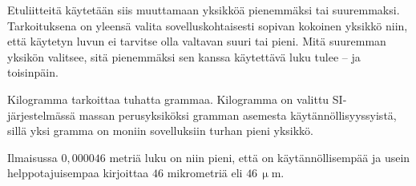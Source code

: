 

Etuliitteitä käytetään siis muuttamaan yksikköä pienemmäksi tai suuremmaksi. Tarkoituksena on yleensä valita sovelluskohtaisesti sopivan kokoinen yksikkö niin, että käytetyn luvun ei tarvitse olla valtavan suuri tai pieni. Mitä suuremman yksikön valitsee, sitä pienemmäksi sen kanssa käytettävä luku tulee -- ja toisinpäin.

\begin{esimerkki}
Kilogramma tarkoittaa tuhatta grammaa. Kilogramma on valittu SI-järjestelmässä massan perusyksiköksi gramman asemesta käytännöllisyyssyistä, sillä yksi gramma on moniin sovelluksiin turhan pieni yksikkö.
\end{esimerkki}

\begin{esimerkki}
Ilmaisussa $0,000046$ metriä luku on niin pieni, että on käytännöllisempää ja usein helppotajuisempaa kirjoittaa $46$ mikrometriä eli $46$\,$\upmu$m.
\end{esimerkki}

